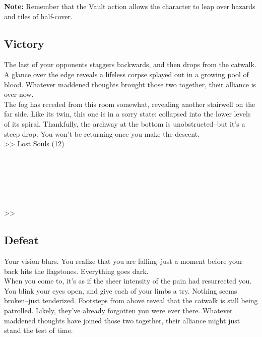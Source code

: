 \begin{tcolorbox}
\textbf{Note:} Remember that the Vault action allows the character to leap over hazards and tiles of half-cover.
\end{tcolorbox}

\pagebreak

\subsection*{Victory}
The last of your opponents staggers backwards, and then drops from the catwalk. A glance over the edge reveals a lifeless corpse splayed out in a growing pool of blood. Whatever maddened thoughts brought those two together, their alliance is over now.\\

The fog has receded from this room somewhat, revealing another stairwell on the far side. Like its twin, this one is in a sorry state: collapsed into the lower levels of its spiral. Thankfully, the archway at the bottom is unobstructed--but it’s a steep drop. You won’t be returning once you make the descent.\\

>> Lost Souls (12)\\
\\
\\
\\
\\
\\
\\
>> 

\subsection*{Defeat}
Your vision blurs. You realize that you are falling--just a moment before your back hits the flagstones. Everything goes dark.\\

When you come to, it’s as if the sheer intensity of the pain had resurrected you. You blink your eyes open, and give each of your limbs a try. Nothing seems broken--just tenderized. Footsteps from above reveal that the catwalk is still being patrolled. Likely, they’ve already forgotten you were ever there. Whatever maddened thoughts have joined those two together, their alliance might just stand the test of time.\\

